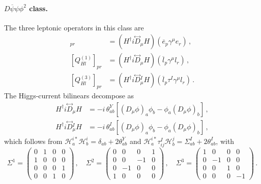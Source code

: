 \paragraph{$D \overline \psi \psi \phi^2$ class.}
The three leptonic operators in this class are
\begin{align}
    [Q_{He}]_{pr} &= \left( H^\dagger i\overset{\leftrightarrow}{D}{}_\mu H\right)\left(\overline e_p \gamma^\mu e_r \right)\,,\\
    [Q_{Hl}^{(1)}]_{pr} &= \left( H^\dagger i\overset{\leftrightarrow}{D}{}_\mu H\right)\left(\overline l_p \gamma^\mu l_r \right) \,,\\
    [Q_{Hl}^{(3)}]_{pr} &= \left( H^\dagger i\overset{\leftrightarrow}{D}{}_\mu^I H\right)\left(\overline l_p \tau^I \gamma^\mu l_r \right) \,.
\end{align}
The Higgs-current bilinears decompose as
\begin{align}
    H^\dagger i\overset{\leftrightarrow}{D}{}_\mu H &= -i\,\theta^Y_{ab}\left[(D_\mu\phi)_a\phi_b - \phi_a(D_\mu\phi)_b\right]\,,\\
    H^\dagger i\overset{\leftrightarrow}{D}{}^I_\mu H &= -i\,\theta^I_{ab}\left[(D_\mu\phi)_a\phi_b - \phi_a(D_\mu\phi)_b\right]\,,
\end{align}
which follows from $\mathcal{H}^{i*}_a\mathcal{H}^i_b = \delta_{ab}+2\theta^Y_{ab}$ and $\mathcal{H}^{i*}_a\tau^I_{ij}\mathcal{H}^j_b = \Sigma^I_{ab} + 2\theta^I_{ab}$, with
\begin{equation}
    \Sigma^1 = \begin{pmatrix}
        0 & 1 & 0 & 0\\
        1 & 0 & 0 & 0\\
        0 & 0 & 0 & 1\\
        0 & 0 & 1 & 0
    \end{pmatrix}\,,\quad  \Sigma^2 = \begin{pmatrix}
        0 & 0 & 0 & 1\\
        0 & 0 & -1 & 0\\
        0 & -1 & 0 & 0\\
        1 & 0 & 0 & 0
    \end{pmatrix}\,,\quad  \Sigma^3 = \begin{pmatrix}
        1 & 0 & 0 & 0\\
        0 & -1 & 0 & 0\\
        0 & 0 & 1 & 0\\
        0 & 0 & 0 & -1
    \end{pmatrix}\,.
    \label{eq:Sigma_matrices}
\end{equation}
